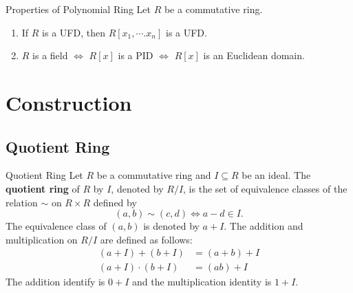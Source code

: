 \begin{proposition}{Properties of Polynomial Ring}{}
    Let $R$ be a commutative ring.
    \begin{enumerate}
        \item If $R$ is a UFD, then $R[x_1,\cdots.x_n]$ is a UFD.
        \item $R$ is a field $\iff$ $R[x]$ is a PID $\iff$ $R[x]$ is an Euclidean domain.
    \end{enumerate}
\end{proposition}


\section{Construction}

\subsection{Quotient Ring}
\begin{definition}{Quotient Ring}{}
    Let $R$ be a commutative ring and $I\subseteq R$ be an ideal. The \textbf{quotient ring} of $R$ by $I$, denoted by $R/I$, is the set of equivalence classes of the relation $\sim$ on $R\times R$ defined by $$(a,b)\sim (c,d)\iff a-d\in I.$$ The equivalence class of $(a,b)$ is denoted by $a+I$. The addition and multiplication on $R/I$ are defined as follows:
    \begin{align*}
        (a+I)+(b+I)&=(a+b)+I\\
        (a+I)\cdot(b+I)&=(ab)+I
    \end{align*}
    The addition identify is $0+I$ and the multiplication identity is $1+I$.
\end{definition}

